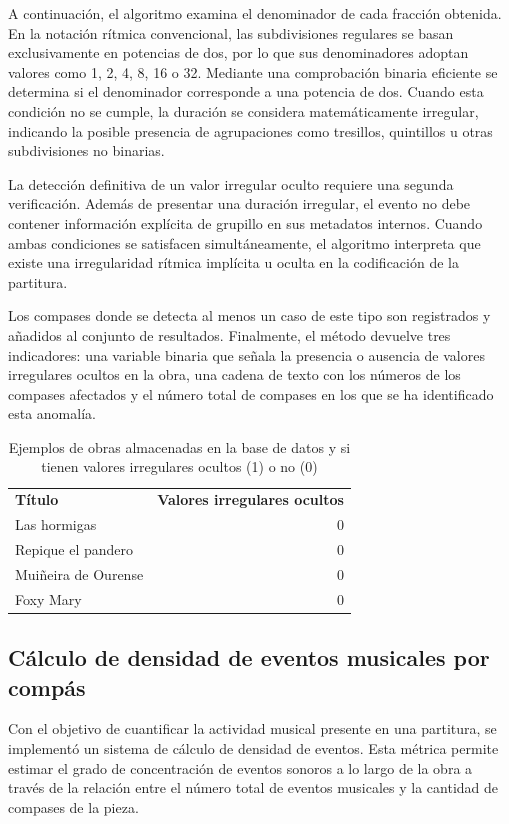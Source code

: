 A continuación, el algoritmo examina el denominador de cada fracción obtenida. En la notación rítmica convencional, las subdivisiones regulares se basan exclusivamente en potencias de dos, por lo que sus denominadores adoptan valores como 1, 2, 4, 8, 16 o 32. Mediante una comprobación binaria eficiente se determina si el denominador corresponde a una potencia de dos. Cuando esta condición no se cumple, la duración se considera matemáticamente irregular, indicando la posible presencia de agrupaciones como tresillos, quintillos u otras subdivisiones no binarias.

La detección definitiva de un valor irregular oculto requiere una segunda verificación. Además de presentar una duración irregular, el evento no debe contener información explícita de grupillo en sus metadatos internos. Cuando ambas condiciones se satisfacen simultáneamente, el algoritmo interpreta que existe una irregularidad rítmica implícita u oculta en la codificación de la partitura.

Los compases donde se detecta al menos un caso de este tipo son registrados y añadidos al conjunto de resultados. Finalmente, el método devuelve tres indicadores: una variable binaria que señala la presencia o ausencia de valores irregulares ocultos en la obra, una cadena de texto con los números de los compases afectados y el número total de compases en los que se ha identificado esta anomalía.

\begin{table}[H]
\centering
\begin{tabular}{lr}
\textbf{Título} & \textbf{Valores irregulares ocultos} \\
Las hormigas & 0 \\
Repique el pandero & 0 \\
Muiñeira de Ourense & 0 \\
Foxy Mary & 0 \\
\end{tabular}
\caption{Ejemplos de obras almacenadas en la base de datos y si tienen valores irregulares ocultos (1) o no (0)}
\end{table}

\subsection{Cálculo de densidad de eventos musicales por compás}
Con el objetivo de cuantificar la actividad musical presente en una partitura, se implementó un sistema de cálculo de densidad de eventos. Esta métrica permite estimar el grado de concentración de eventos sonoros a lo largo de la obra a través de la relación entre el número total de eventos musicales y la cantidad de compases de la pieza.

